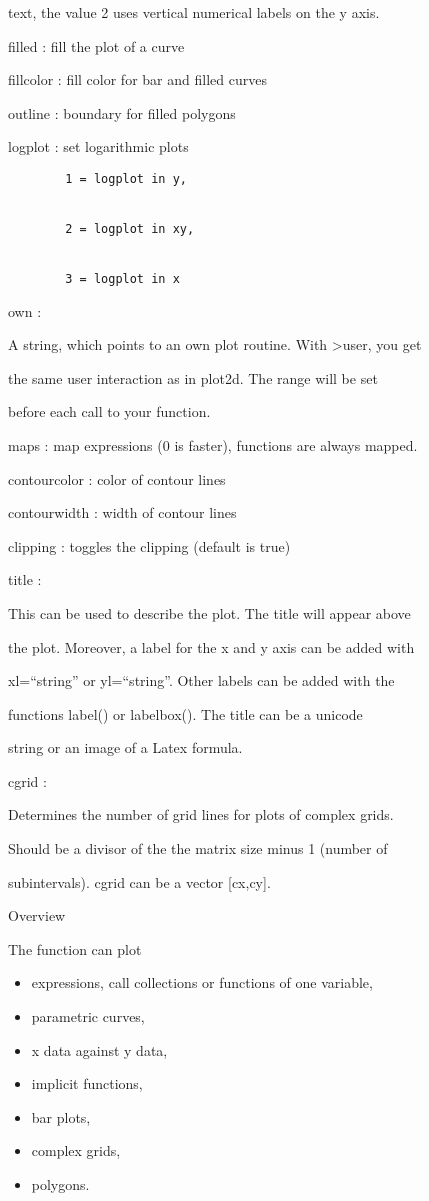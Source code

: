 \documentclass[
]{book}
\begin{document}
text, the value 2 uses vertical numerical labels on the y axis.

filled : fill the plot of a curve

fillcolor : fill color for bar and filled curves

outline : boundary for filled polygons

logplot : set logarithmic plots

\begin{verbatim}
        1 = logplot in y,


        2 = logplot in xy,


        3 = logplot in x
\end{verbatim}

own :

A string, which points to an own plot routine. With \textgreater user, you get

the same user interaction as in plot2d. The range will be set

before each call to your function.

maps : map expressions (0 is faster), functions are always mapped.

contourcolor : color of contour lines

contourwidth : width of contour lines

clipping : toggles the clipping (default is true)

title :

This can be used to describe the plot. The title will appear above

the plot. Moreover, a label for the x and y axis can be added with

xl=``string'' or yl=``string''. Other labels can be added with the

functions label() or labelbox(). The title can be a unicode

string or an image of a Latex formula.

cgrid :

Determines the number of grid lines for plots of complex grids.

Should be a divisor of the the matrix size minus 1 (number of

subintervals). cgrid can be a vector {[}cx,cy{]}.

Overview

The function can plot

\begin{itemize}
\item
  expressions, call collections or functions of one variable,
\item
  parametric curves,
\item
  x data against y data,
\item
  implicit functions,
\item
  bar plots,
\item
  complex grids,
\item
  polygons.
\end{itemize}
\end{document}
